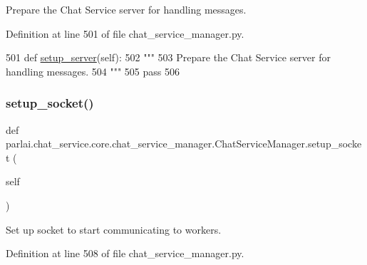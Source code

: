\begin{DoxyVerb}Prepare the Chat Service server for handling messages.
\end{DoxyVerb}
 

Definition at line 501 of file chat\+\_\+service\+\_\+manager.\+py.


\begin{DoxyCode}
501     \textcolor{keyword}{def }\hyperlink{namespaceparlai_1_1chat__service_1_1services_1_1messenger_1_1server__utils_afb56b04206cd0f42384438f1ac6d9cda}{setup\_server}(self):
502         \textcolor{stringliteral}{"""}
503 \textcolor{stringliteral}{        Prepare the Chat Service server for handling messages.}
504 \textcolor{stringliteral}{        """}
505         \textcolor{keywordflow}{pass}
506 
\end{DoxyCode}
\mbox{\label{classparlai_1_1chat__service_1_1core_1_1chat__service__manager_1_1ChatServiceManager_a167613812d6f3eaaa0fb1b36bf98be09}} 
\subsubsection{\texorpdfstring{setup\+\_\+socket()}{setup\_socket()}}
{\footnotesize\ttfamily def parlai.\+chat\+\_\+service.\+core.\+chat\+\_\+service\+\_\+manager.\+Chat\+Service\+Manager.\+setup\+\_\+socket (\begin{DoxyParamCaption}\item[{}]{self }\end{DoxyParamCaption})}

\begin{DoxyVerb}Set up socket to start communicating to workers.
\end{DoxyVerb}
 

Definition at line 508 of file chat\+\_\+service\+\_\+manager.\+py.



